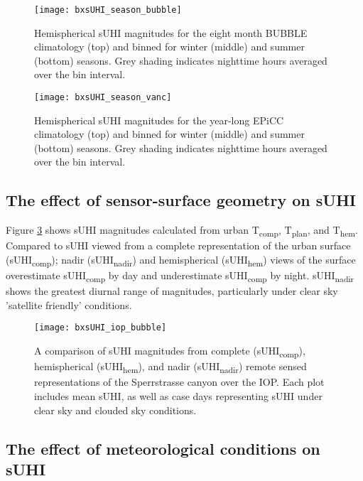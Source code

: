 \begin{bibunit}
\begin{figure}[H]
	\centering
	\texttt{[image: bxsUHI\_season\_bubble]}
	\caption{Hemispherical sUHI magnitudes for the eight month BUBBLE climatology (top) and binned for winter (middle) and summer (bottom) seasons. Grey shading indicates nighttime hours averaged over the bin interval.}
	\label{bxsUHI_season_bubble}
\end{figure}

\begin{figure}[H]
	\centering
	\texttt{[image: bxsUHI\_season\_vanc]}
	\caption{Hemispherical sUHI magnitudes for the year-long EPiCC climatology (top) and binned for winter (middle) and summer (bottom) seasons. Grey shading indicates nighttime hours averaged over the bin interval.}
	\label{bxsUHI_season_vanc}
\end{figure}

\subsection{The effect of sensor-surface geometry on sUHI}

Figure \ref{bx_suhi_compare} shows sUHI magnitudes calculated from urban T\textsubscript{comp}, T\textsubscript{plan}, and T\textsubscript{hem}. Compared to sUHI viewed from a complete representation of the urban surface (sUHI\textsubscript{comp}); nadir (sUHI\textsubscript{nadir}) and hemispherical (sUHI\textsubscript{hem}) views of the surface overestimate sUHI\textsubscript{comp} by day and underestimate sUHI\textsubscript{comp} by night. sUHI\textsubscript{nadir} shows the greatest diurnal range of magnitudes, particularly under clear sky 'satellite friendly' conditions. 

\begin{figure}[H]
	\centering
	\texttt{[image: bxsUHI\_iop\_bubble]}
	\caption{A comparison of sUHI magnitudes from complete (sUHI\textsubscript{comp}), hemispherical (sUHI\textsubscript{hem}), and nadir (sUHI\textsubscript{nadir}) remote sensed representations of the Sperrstrasse canyon over the IOP. Each plot includes mean sUHI, as well as case days representing sUHI under clear sky and clouded sky conditions.}
	\label{bx_suhi_compare}
\end{figure}

\subsection{The effect of meteorological conditions on sUHI}


\end{bibunit}
